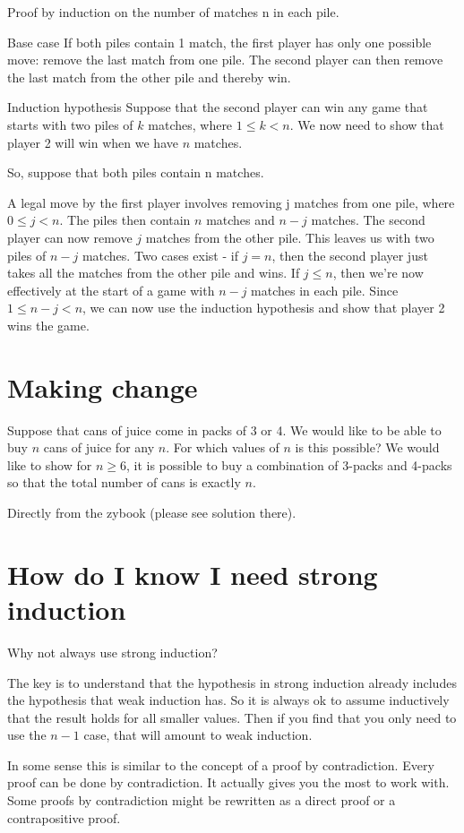 \documentclass[12pt]{article}
\begin{document}
Proof by induction on the number of matches n in each pile.

Base case If both piles contain 1 match, the first player has only one possible move:
remove the last match from one pile. The second player can then remove the last
match from the other pile and thereby win.

Induction hypothesis Suppose that the second player can win any game that starts
with two piles of $k$ matches, where $1\le k < n$. We now need to show that player 2
will win when we have $n$ matches. 

So, suppose that both piles contain n matches.

A legal move by the first player involves removing j matches from one pile, where
$0 \le j< n$. The piles then contain $n$ matches and $n - j$ matches. The second player
can now remove $j$ matches from the other pile. This leaves us with two piles of $n - j$
matches. Two cases exist - if $j = n$, then the second player just takes all the matches
from the other pile and wins. If $j \le n$, then we’re now effectively at the start of a game
with $n - j$ matches in each pile. Since $1 \le  n-j < n$, we can now use the induction
hypothesis and show that player 2 wins the game.

\section*{Making change}

Suppose that cans of juice come in packs of 3 or 4. We would like to be able to buy $n$ cans of juice for any $n$. For which values of $n$ is this possible? We would like to show for $n \ge 6$, it is possible to buy a combination of 3-packs and 4-packs so that the total number of cans is exactly $n$.

Directly from the zybook (please see solution there).


\section*{How do I know I need strong induction}
Why not always use strong induction? 

The key is to understand that the hypothesis in strong induction already includes the hypothesis that weak induction has. So it is always ok to assume inductively that the result holds for all smaller values. Then if you find that you only need to use the $n-1$ case, that will amount to weak induction. 

In some sense this is similar to the concept of a proof by contradiction. Every proof can be done by contradiction. It actually gives you the most to work with. Some proofs by contradiction might be rewritten as a direct proof or a contrapositive proof. 
\end{document}
